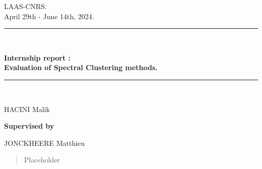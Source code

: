 \documentclass[a4paper,12pt]{article}
\date{June 7, 2024.}
\theoremstyle{definition}
\theoremstyle{plain}
\begin{document}
\BgThispage
\begin{titlepage}
	\centering
	\vspace*{3cm}
	{\large LAAS-CNRS.\\
		April 29th - June 14th, 2024.
		\par}
	\rule{0.6\textwidth}{2pt}\\
	{\huge\bfseries Internship report : \\ Evaluation of Spectral Clustering methods. \\\par}
	\rule{0.6\textwidth}{2pt}\\
	\vspace{2cm}
	{\large
		HACINI Malik
		\par }
	\vspace{1cm}
	{\Large\bfseries Supervised by\par} \:
	{\large JONCKHEERE Matthieu\par}
	
\end{titlepage}

\begin{abstract}
	Placeholder
\end{abstract}
\tableofcontents
\end{document}
